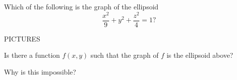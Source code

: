 \documentclass{ximera}
\begin{document}
\begin{problem}
\begin{image}
\end{image}
\end{problem}

\begin{problem}
Which of the following is the graph of the ellipsoid
\[
\frac{x^2}{9}+ y^2 + \frac{z^2}{4} = 1?
\]

PICTURES

Is there a function $f(x,y)$ such that the graph of $f$ is the ellipsoid above?
\begin{multipleChoice}
\end{multipleChoice}

\begin{problem}
Why is this impossible?
\begin{multipleChoice}
\end{multipleChoice}
\end{problem}

\end{problem}
\end{document}
